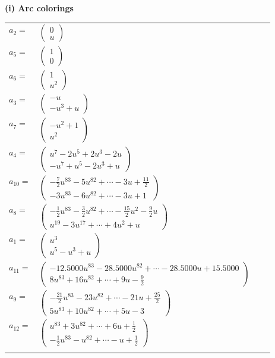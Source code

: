 \documentclass[1p]{elsarticle_modified}
\theoremstyle{definition}
\begin{document}
\flushleft \textbf{(i) Arc colorings}\\
\begin{tabular}{m{7pt} m{180pt} m{7pt} m{180pt} }
\flushright $a_{2}=$&$\begin{pmatrix}0\\u\end{pmatrix}$ \\
\flushright $a_{5}=$&$\begin{pmatrix}1\\0\end{pmatrix}$ \\
\flushright $a_{6}=$&$\begin{pmatrix}1\\u^2\end{pmatrix}$ \\
\flushright $a_{3}=$&$\begin{pmatrix}- u\\- u^3+u\end{pmatrix}$ \\
\flushright $a_{7}=$&$\begin{pmatrix}- u^2+1\\u^2\end{pmatrix}$ \\
\flushright $a_{4}=$&$\begin{pmatrix}u^7-2 u^5+2 u^3-2 u\\- u^7+u^5-2 u^3+u\end{pmatrix}$ \\
\flushright $a_{10}=$&$\begin{pmatrix}-\frac{7}{2} u^{83}-5 u^{82}+\cdots-3 u+\frac{11}{2}\\-3 u^{83}-6 u^{82}+\cdots-3 u+1\end{pmatrix}$ \\
\flushright $a_{8}=$&$\begin{pmatrix}-\frac{1}{2} u^{83}-\frac{3}{2} u^{82}+\cdots-\frac{15}{2} u^2-\frac{9}{2} u\\u^{19}-3 u^{17}+\cdots+4 u^2+u\end{pmatrix}$ \\
\flushright $a_{1}=$&$\begin{pmatrix}u^3\\u^5- u^3+u\end{pmatrix}$ \\
\flushright $a_{11}=$&$\begin{pmatrix}-12.5000 u^{83}-28.5000 u^{82}+\cdots-28.5000 u+15.5000\\8 u^{83}+16 u^{82}+\cdots+9 u-\frac{9}{2}\end{pmatrix}$ \\
\flushright $a_{9}=$&$\begin{pmatrix}-\frac{21}{2} u^{83}-23 u^{82}+\cdots-21 u+\frac{25}{2}\\5 u^{83}+10 u^{82}+\cdots+5 u-3\end{pmatrix}$ \\
\flushright $a_{12}=$&$\begin{pmatrix}u^{83}+3 u^{82}+\cdots+6 u+\frac{1}{2}\\-\frac{1}{2} u^{83}- u^{82}+\cdots- u+\frac{1}{2}\end{pmatrix}$\\&\end{tabular}
\end{document}
